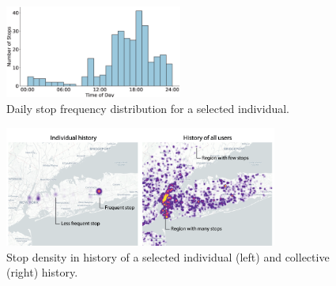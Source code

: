 \documentclass{article}
\begin{document}
\begin{figure}[t!]
    \includegraphics[width=0.52\textwidth]{./Images/histogram_stops_time_per_day_for_individual.eps}
	\centering
	\caption{Daily stop frequency distribution for a selected individual.}
	\label{fig:stop_history}
\end{figure}

\begin{figure}[ht]
    \includegraphics[width=0.8\textwidth]{./Images/Figure_history.png}
	\centering
	\caption{Stop density in history of a selected individual (left) and collective (right) history.}
	\label{fig:fig_history_user}
\end{figure}
\end{document}
